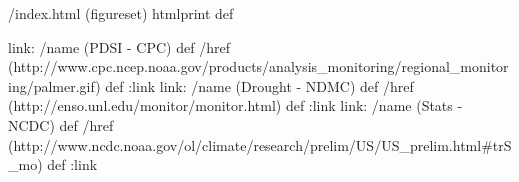 /index.html {(figureset) htmlprint} def
\begin{ingrid}
link:
/name (PDSI - CPC) def
/href (http://www.cpc.ncep.noaa.gov/products/analysis_monitoring/regional_monitoring/palmer.gif) def
:link
link:
/name (Drought - NDMC) def
/href (http://enso.unl.edu/monitor/monitor.html) def
:link
link:
/name (Stats - NCDC) def
/href (http://www.ncdc.noaa.gov/ol/climate/research/prelim/US/US_prelim.html#trS_mo) def
:link

\end{ingrid}